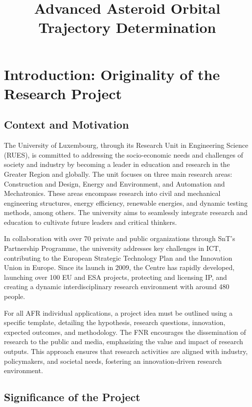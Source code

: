 \documentclass{article}
\title{Advanced Asteroid Orbital Trajectory Determination}
\author{}
\date{}
\begin{document}
\maketitle

\section{Introduction: Originality of the Research Project}

\subsection{Context and Motivation}

The University of Luxembourg, through its Research Unit in Engineering Science (RUES), is committed to addressing the socio-economic needs and challenges of society and industry by becoming a leader in education and research in the Greater Region and globally. The unit focuses on three main research areas: Construction and Design, Energy and Environment, and Automation and Mechatronics. These areas encompass research into civil and mechanical engineering structures, energy efficiency, renewable energies, and dynamic testing methods, among others. The university aims to seamlessly integrate research and education to cultivate future leaders and critical thinkers.

In collaboration with over 70 private and public organizations through SnT’s Partnership Programme, the university addresses key challenges in ICT, contributing to the European Strategic Technology Plan and the Innovation Union in Europe. Since its launch in 2009, the Centre has rapidly developed, launching over 100 EU and ESA projects, protecting and licensing IP, and creating a dynamic interdisciplinary research environment with around 480 people.

For all AFR individual applications, a project idea must be outlined using a specific template, detailing the hypothesis, research questions, innovation, expected outcomes, and methodology. The FNR encourages the dissemination of research to the public and media, emphasizing the value and impact of research outputs. This approach ensures that research activities are aligned with industry, policymakers, and societal needs, fostering an innovation-driven research environment.

\subsection{Significance of the Project}
\end{document}
